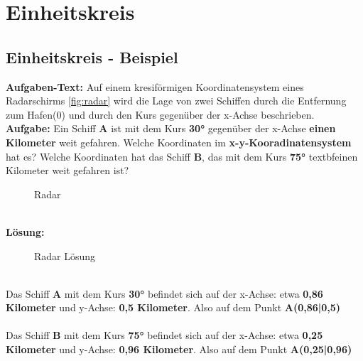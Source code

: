 \documentclass[12pt,a4paper]{article}
\begin{document}
\section{Einheitskreis}
\subsection{Einheitskreis - Beispiel}

\textbf{Aufgaben-Text:} Auf einem kresiförmigen Koordinatensystem eines Radarschirms \autoref{fig:radar} wird die Lage von zwei Schiffen durch die Entfernung zum Hafen(0) und durch den Kurs gegenüber der x-Achse beschrieben. \\
\textbf{Aufgabe:} Ein Schiff \textbf{A} ist mit dem Kurs \textbf{30°} gegenüber der x-Achse \textbf{einen Kilometer} weit gefahren. Welche Koordinaten im \textbf{x-y-Kooradinatensystem} hat es? Welche Koordinaten hat das Schiff \textbf{B}, das mit dem Kurs \textbf{75°} textbf{einen Kilometer} weit gefahren ist?
\begin{figure}[hb!]
    \centering
    \def\svgwidth{250px}
    
    \caption{Radar}
  	\label{fig:radar}
\end{figure}
\\
\noindent
\textbf{Lösung:} 
\begin{wrapfigure}[9]{r}{0.5\textwidth}
	    \def\svgwidth{250px}
    
    \caption{Radar Lösung}
  	\label{fig:radar_loesung}
\end{wrapfigure}
\\
Das Schiff \textbf{A} mit dem Kurs \textbf{30°} befindet sich auf der x-Achse: etwa \textbf{0,86 Kilometer} und y-Achse: \textbf{0,5 Kilometer}. Also auf dem Punkt \textbf{A(0,86|0,5)} \\  \\
Das Schiff \textbf{B} mit dem Kurs \textbf{75°} befindet sich auf der x-Achse: etwa \textbf{0,25 Kilometer} und y-Achse: \textbf{0,96 Kilometer}. Also auf dem Punkt \textbf{A(0,25|0,96)}

\newpage
\end{document}
